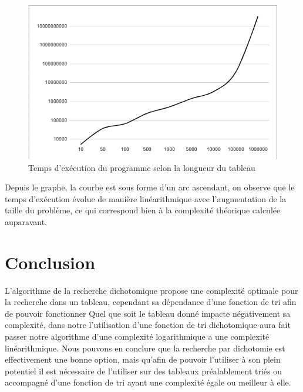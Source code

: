 \begin{figure}[H]
    \centering
        \includegraphics[scale=0.5]{./ressources/tempsexecutiondico.png}
        \caption{Temps d'exécution du programme selon la longueur du tableau}
    \label{fig:temps_exec_dico}
\end{figure}
\par
Depuis le graphe, la courbe est sous forme d'un arc ascendant, on observe que le temps d'exécution évolue de manière linéarithmique avec l'augmentation de la taille du problème, ce qui correspond bien à la complexité théorique calculée auparavant. 

\section{Conclusion}
L'algorithme de la recherche dichotomique propose une complexité optimale pour la recherche dans un tableau, cependant sa dépendance d'une fonction de tri afin de pouvoir fonctionner Quel que soit le tableau donné impacte négativement sa complexité, dans notre l'utilisation d'une fonction de tri dichotomique aura fait passer notre algorithme d'une complexité logarithmique a une complexité linéarithmique. Nous pouvons en conclure que la recherche par dichotomie est effectivement une bonne option, mais qu'afin de pouvoir l'utiliser à son plein potentiel il est nécessaire de l'utiliser sur des tableaux préalablement triés ou accompagné d'une fonction de tri ayant une complexité égale ou meilleur à elle.
